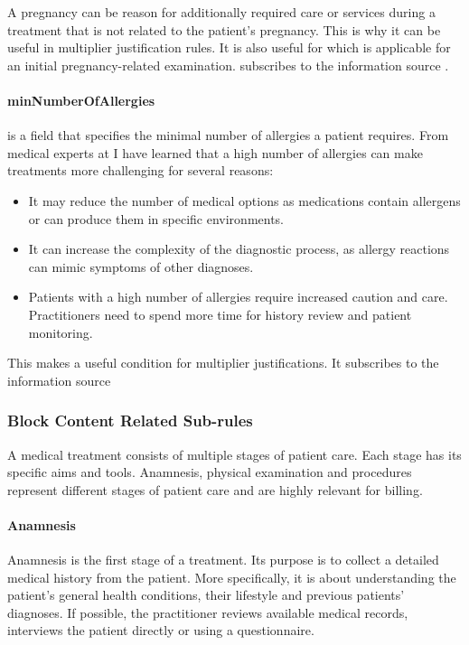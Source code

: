 

A pregnancy can be reason for additionally required care or services during a treatment that is not related to the patient's pregnancy.
This is why it can be useful in multiplier justification rules.
It is also useful for  which is applicable for an initial pregnancy-related examination.
 subscribes to the information source .

\paragraph{minNumberOfAllergies}
 is a field that specifies the minimal number of allergies a patient requires.
From medical experts at \AV I have learned that a high number of allergies can make treatments more challenging for several reasons:
\begin{itemize}
    \item It may reduce the number of medical options as medications contain allergens or can produce them in specific environments.
    \item It can increase the complexity of the diagnostic process, as allergy reactions can mimic symptoms of other diagnoses.
    \item Patients with a high number of allergies require increased caution and care.
    Practitioners need to spend more time for history review and patient monitoring.
\end{itemize}
This makes  a useful condition for multiplier justifications.
It subscribes to the information source 

\subsubsection{Block Content Related Sub-rules}

A medical treatment consists of multiple stages of patient care.
Each stage has its specific aims and tools.
Anamnesis,
physical examination and procedures represent different stages of patient care and are highly relevant for billing.

\paragraph{Anamnesis}
Anamnesis is the first stage of a treatment.
Its purpose is to collect a detailed medical history from the patient\cite{lino2021medical}.
More specifically, it is about understanding the patient's general health conditions,
their lifestyle and previous patients' diagnoses.
If possible, the practitioner reviews available medical records,
interviews the patient directly or using a questionnaire\cite{zhang2011anamnevis}.

